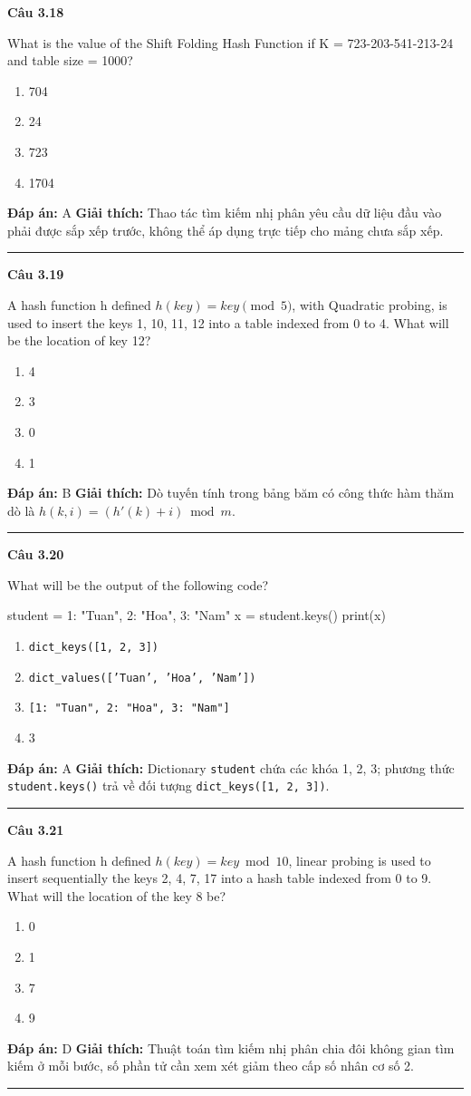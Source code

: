\documentclass[11pt,a4paper]{article}
\newenvironment{question}[1]{%
  \par\vspace{1em}\noindent\textbf{\large Câu #1}\par\vspace{0.4em}
}{%
  \par\vspace{1em}\hrule\vspace{0.6em}
}
\newenvironment{choices}{%
  \begin{enumerate}[label=\textbf{\Alph*.},leftmargin=2.2em,itemsep=2pt,topsep=3pt]
}{%
  \end{enumerate}
}
\newcommand{\choice}{\item}
\newenvironment{codebox}{%
  \begin{tcolorbox}[colback=gray!8!white,colframe=gray!50!black,arc=1.5mm,boxrule=0.6pt,left=3mm,right=3mm,top=2.5mm,bottom=2.5mm]
  \ttfamily\small
}{%
  \end{tcolorbox}
}
\begin{document}
\begin{question}{3.18}
What is the value of the Shift Folding Hash Function if K = 723-203-541-213-24 and table size = 1000?
\begin{choices}
\choice 704
\choice 24
\choice 723
\choice 1704
\end{choices}
\textbf{Đáp án:} A
\textbf{Giải thích:} Thao tác tìm kiếm nhị phân yêu cầu dữ liệu đầu vào phải được sắp xếp trước, không thể áp dụng trực tiếp cho mảng chưa sắp xếp.
\end{question}

\begin{question}{3.19}
A hash function h defined $h(key) = key \pmod{5}$, with Quadratic probing, is used to insert the keys 1, 10, 11, 12 into a table indexed from 0 to 4. What will be the location of key 12?
\begin{choices}
\choice 4
\choice 3
\choice 0
\choice 1
\end{choices}
\textbf{Đáp án:} B
\textbf{Giải thích:} Dò tuyến tính trong bảng băm có công thức hàm thăm dò là $h(k, i) = (h'(k) + i) \bmod m$.
\end{question}

\begin{question}{3.20}
What will be the output of the following code?
\begin{codebox}
student = {
  1: "Tuan",
  2: "Hoa",
  3: "Nam"
}
x = student.keys()
print(x)
\end{codebox}
\begin{choices}
\choice \texttt{dict\_keys([1, 2, 3])}
\choice \texttt{dict\_values(['Tuan', 'Hoa', 'Nam'])}
\choice \texttt{[1: "Tuan", 2: "Hoa", 3: "Nam"]}
\choice 3
\end{choices}
\textbf{Đáp án:} A
\textbf{Giải thích:} Dictionary \texttt{student} chứa các khóa 1, 2, 3; phương thức \texttt{student.keys()} trả về đối tượng \texttt{dict\_keys([1, 2, 3])}.
\end{question}

\begin{question}{3.21}
A hash function h defined $h(key) = key \bmod 10$, linear probing is used to insert sequentially the keys 2, 4, 7, 17 into a hash table indexed from 0 to 9. What will the location of the key 8 be?
\begin{choices}
\choice 0
\choice 1
\choice 7
\choice 9
\end{choices}
\textbf{Đáp án:} D
\textbf{Giải thích:} Thuật toán tìm kiếm nhị phân chia đôi không gian tìm kiếm ở mỗi bước, số phần tử cần xem xét giảm theo cấp số nhân cơ số 2.
\end{question}
\end{document}
